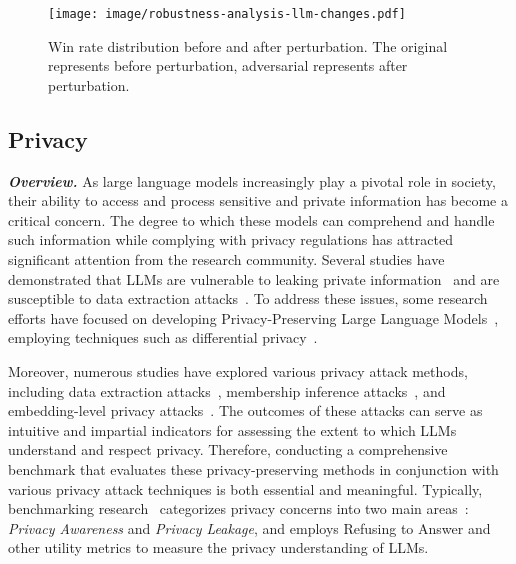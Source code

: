 \begin{figure}[t]
    \centering
    \texttt{[image: image/robustness-analysis-llm-changes.pdf]}
    \caption{Win rate distribution before and after perturbation. The original represents before perturbation, adversarial represents after perturbation.}
    \label{fig:robustness_llm_changes}
    \vspace{-15pt}
\end{figure}



\subsection{Privacy}

\textbf{\textit{Overview.}} As large language models increasingly play a pivotal role in society, their ability to access and process sensitive and private information has become a critical concern. The degree to which these models can comprehend and handle such information while complying with privacy regulations has attracted significant attention from the research community. Several studies have demonstrated that LLMs are vulnerable to leaking private information~\cite{beyondmemorization, leakinginfo, probeprivacyleakage} and are susceptible to data extraction attacks~\cite{wang2023decodingtrust, multistepattack}. To address these issues, some research efforts have focused on developing Privacy-Preserving Large Language Models~\cite{behnia2022ew, montagna2023data, chen2023federated, kim2023propile, utpala2023locally}, employing techniques such as differential privacy~\cite{Qu2021NaturalLU, huang-etal-2022-large, Igamberdiev2023DPBARTFP}.

Moreover, numerous studies have explored various privacy attack methods, including data extraction attacks~\cite{carlini2021extracting}, membership inference attacks~\cite{Shokri2016MembershipIA}, and embedding-level privacy attacks~\cite{10.1145/3372297.3417270}. The outcomes of these attacks can serve as intuitive and impartial indicators for assessing the extent to which LLMs understand and respect privacy. Therefore, conducting a comprehensive benchmark that evaluates these privacy-preserving methods in conjunction with various privacy attack techniques is both essential and meaningful. Typically, benchmarking research~\cite{zhang2024benchmarkingtrustworthinessmultimodallarge, huang2024position} categorizes privacy concerns into two main areas~\cite{Li2023MultistepJP, Huang2022}: \textit{Privacy Awareness} and \textit{Privacy Leakage}, and employs Refusing to Answer and other utility metrics to measure the privacy understanding of LLMs. 


